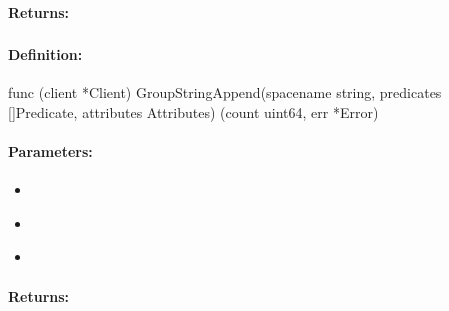 \paragraph{Returns:}


\pagebreak
\subsubsection{}
\label{api:Go:GroupStringAppend}


\paragraph{Definition:}
\begin{gocode}
func (client *Client) GroupStringAppend(spacename string, predicates []Predicate, attributes Attributes) (count uint64, err *Error)
\end{gocode}

\paragraph{Parameters:}
\begin{itemize}[noitemsep]
\item {}\\

\item {}\\

\item {}\\

\end{itemize}

\paragraph{Returns:}


\pagebreak
\subsubsection{}
\label{api:Go:ListLpush}


